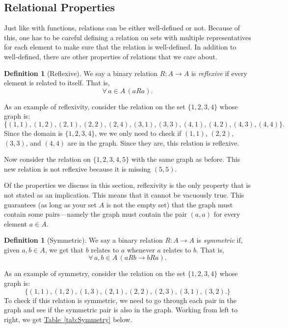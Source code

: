 \documentclass[11pt,oneside]{book}
\theoremstyle{definition}
\newtheorem{defn}[thm]{Definition}
\begin{document}
\subsection{Relational Properties}
Just like with functions, relations can be either well-defined or not.
Because of this, one has to be careful defining a relation on sets with multiple representatives for each element to make sure that the relation is well-defined.
In addition to well-defined, there are other properties of relations that we care about.

\begin{defn}[Reflexive]
    We say a binary relation $R: A \to A$ is \emph{reflexive} if every element is related to itself.
    That is,
    \[ \forall\, a \in A\, (aRa). \]
\end{defn}

As an example of reflexivity, consider the relation on the set $\{ 1, 2, 3, 4 \}$ whose graph is:
\[ \{ (1, 1), (1, 2), (2, 1), (2, 2), (2, 4), (3, 1), (3, 3), (4, 1), (4, 2), (4, 3), (4, 4) \}. \]
Since the domain is $\{ 1, 2, 3, 4 \}$, we we only need to check if $(1, 1)$, $(2, 2)$, $(3, 3)$, and $(4, 4)$ are in the graph.
Since they are, this relation is reflexive.

Now consider the relation on $\{ 1, 2, 3, 4, 5 \}$ with the same graph as before.
This new relation is not reflexive because it is missing $(5, 5)$.

Of the properties we discuss in this section, reflexivity is the only property that is not stated as an implication.
This means that it cannot be vacuously true.
This guarantees (as long as your set $A$ is not the empty set) that the graph must contain some pairs---namely the graph must contain the pair $(a, a)$ for every element $a \in A$.

\begin{defn}[Symmetric]
    We say a binary relation $R: A \to A$ is \emph{symmetric} if, given $a, b \in A$, we get that $b$ relates to $a$ whenever $a$ relates to $b$.
    That is,
    \[ \forall\, a, b \in A\, (a R b \rightarrow b R a).  \]
\end{defn}

As an example of symmetry, consider the relation on the set $\{ 1, 2, 3, 4 \}$ whose graph is:
\[ \{ (1, 1), (1, 2), (1, 3), (2, 1), (2, 2), (2, 3), (3, 1), (3, 2). \} \]
To check if this relation is symmetric, we need to go through each pair in the graph and see if the symmetric pair is also in the graph.
Working from left to right, we get \hyperref[tab:Symmetry]{Table~\ref*{tab:Symmetry}} below.
\end{document}
